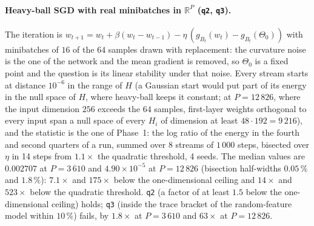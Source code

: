 \documentclass[11pt]{article}
\theoremstyle{remark}
\newcommand{\R}{\mathbb{R}}
\begin{document}
\paragraph{Heavy-ball SGD with real minibatches in $\R^P$ (\texttt{q2}, \texttt{q3}).} The iteration is $w_{t+1}=w_t+\beta(w_t-w_{t-1})-\eta\,(g_{B_t}(w_t)-g_{B_t}(\Theta_0))$ with minibatches of $16$ of the $64$ samples drawn with replacement: the curvature noise is the one of the network and the mean gradient is removed, so $\Theta_0$ is a fixed point and the question is its linear stability under that noise. Every stream starts at distance $10^{-6}$ in the range of $H$ (a Gaussian start would put part of its energy in the null space of $H$, where heavy-ball keeps it constant; at $P=12\,826$, where the input dimension $256$ exceeds the $64$ samples, first-layer weights orthogonal to every input span a null space of every $H_i$ of dimension at least $48\cdot192=9\,216$), and the statistic is the one of Phase~1: the log ratio of the energy in the fourth and second quarters of a run, summed over 8 streams of $1\,000$ steps, bisected over $\eta$ in 14 steps from $1.1\times$ the quadratic threshold, 4 seeds. The median values are $0.002707$ at $P=3\,610$ and $4.90\times10^{-5}$ at $P=12\,826$ (bisection half-widths $0.05\,\%$ and $1.8\,\%$): $7.1\times$ and $175\times$ below the one-dimensional ceiling and $14\times$ and $523\times$ below the quadratic threshold. \texttt{q2} (a factor of at least $1.5$ below the one-dimensional ceiling) holds; \texttt{q3} (inside the trace bracket of the random-feature model within $10\,\%$) fails, by $1.8\times$ at $P=3\,610$ and $63\times$ at $P=12\,826$.
\end{document}
